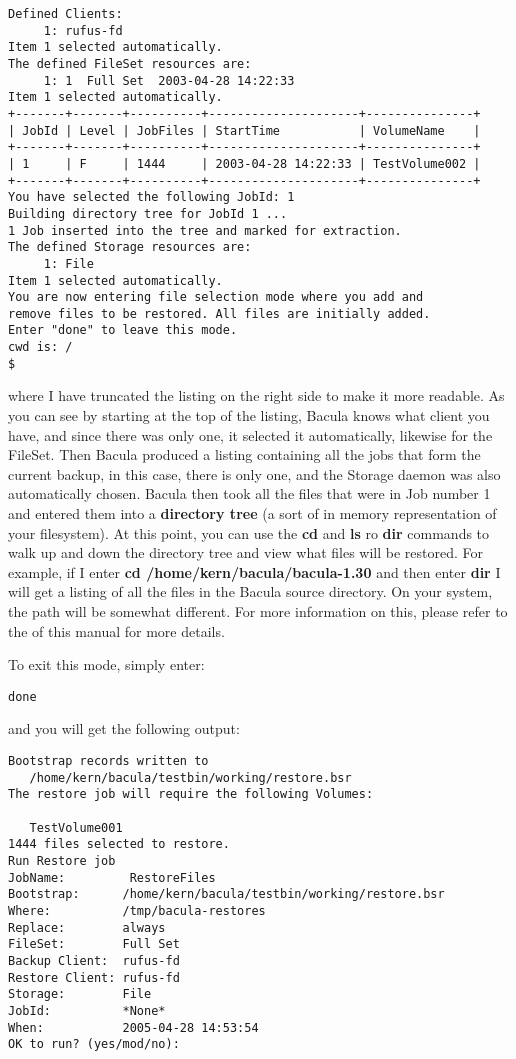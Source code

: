 \footnotesize
\begin{verbatim}
Defined Clients:
     1: rufus-fd
Item 1 selected automatically.
The defined FileSet resources are:
     1: 1  Full Set  2003-04-28 14:22:33
Item 1 selected automatically.
+-------+-------+----------+---------------------+---------------+
| JobId | Level | JobFiles | StartTime           | VolumeName    |
+-------+-------+----------+---------------------+---------------+
| 1     | F     | 1444     | 2003-04-28 14:22:33 | TestVolume002 |
+-------+-------+----------+---------------------+---------------+
You have selected the following JobId: 1
Building directory tree for JobId 1 ...
1 Job inserted into the tree and marked for extraction.
The defined Storage resources are:
     1: File
Item 1 selected automatically.
You are now entering file selection mode where you add and
remove files to be restored. All files are initially added.
Enter "done" to leave this mode.
cwd is: /
$
\end{verbatim}
\normalsize

where I have truncated the listing on the right side to make it more readable.
As you can see by starting at the top of the listing, Bacula knows what client
you have, and since there was only one, it selected it automatically, likewise
for the FileSet. Then Bacula produced a listing containing all the jobs that
form the current backup, in this case, there is only one, and the Storage
daemon was also automatically chosen. Bacula then took all the files that were
in Job number 1 and entered them into a {\bf directory tree} (a sort of in
memory representation of your filesystem). At this point, you can use the {\bf
cd} and {\bf ls} ro {\bf dir} commands to walk up and down the directory tree
and view what files will be restored. For example, if I enter {\bf cd
/home/kern/bacula/bacula-1.30} and then enter {\bf dir} I will get a listing
of all the files in the Bacula source directory. On your system, the path will
be somewhat different. For more information on this, please refer to the 
 of this manual for
more details. 

To exit this mode, simply enter: 

\footnotesize
\begin{verbatim}
done
\end{verbatim}
\normalsize

and you will get the following output: 

\footnotesize
\begin{verbatim}
Bootstrap records written to
   /home/kern/bacula/testbin/working/restore.bsr
The restore job will require the following Volumes:
   
   TestVolume001
1444 files selected to restore.
Run Restore job
JobName:         RestoreFiles
Bootstrap:      /home/kern/bacula/testbin/working/restore.bsr
Where:          /tmp/bacula-restores
Replace:        always
FileSet:        Full Set
Backup Client:  rufus-fd
Restore Client: rufus-fd
Storage:        File
JobId:          *None*
When:           2005-04-28 14:53:54
OK to run? (yes/mod/no):
\end{verbatim}
\normalsize


